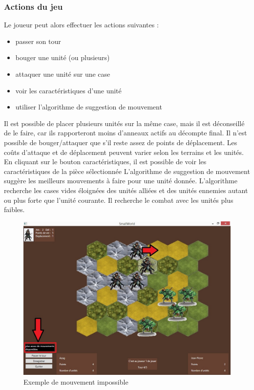 \subsubsection{Actions du jeu}

Le joueur peut alors effectuer les actions suivantes :
\begin{itemize}
\item passer son tour
\item bouger une unité (ou plusieurs)
\item attaquer une unité sur une case
\item voir les caractéristiques d'une unité
\item utiliser l'algorithme de suggestion de mouvement
\newline
\end{itemize}

Il est possible de placer plusieurs unités sur la même case, mais il est déconseillé de le faire, car ils rapporteront moins d'anneaux actifs au décompte final.
\newline
\newline
Il n'est possible de bouger/attaquer que s'il reste assez de points de déplacement. Les coûts d'attaque et de déplacement peuvent varier selon les terrains et les unités.
\newline
En cliquant sur le bouton caractéristiques, il est possible de voir les caractéristiques de la pièce sélectionnée
\newline
\newline
L'algorithme de suggestion de mouvement suggère les meilleurs mouvements à faire pour une unité donnée. L'algorithme recherche les cases vides éloignées des unités alliées et des unités ennemies autant ou plus forte que l'unité courante. Il recherche le combat avec les unités plus faibles.
\newline
\newline

\newpage
\begin{figure}[ht!]
\centering
\includegraphics[scale=0.50]{img/exmovimp.jpg}
\caption{Exemple de mouvement impossible}
\end{figure}

